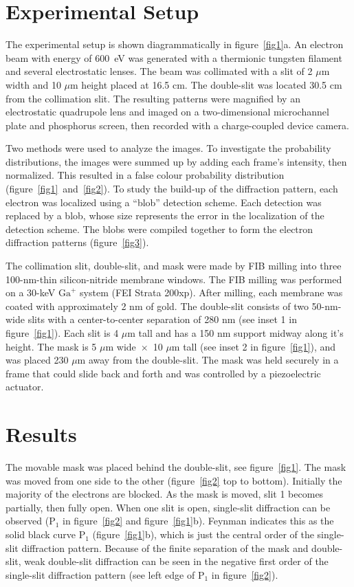 \documentclass[12pt]{iopart}					%
\begin{document}
\section{Experimental Setup}
The experimental setup is shown diagrammatically in figure~\ref{fig1}a.
An electron beam with energy of 600~eV was generated with a thermionic tungsten filament and several electrostatic lenses.
The beam was collimated with a slit of 2 $\mu$m width and 10 $\mu$m height placed at 16.5 cm.
The double-slit was located 30.5 cm from the collimation slit.
The resulting patterns were magnified by an electrostatic quadrupole lens and imaged on a two-dimensional microchannel plate and
phosphorus screen, then recorded with a charge-coupled device camera.

Two methods were used to analyze the images.
To investigate the probability distributions, the images were summed up by adding each frame's intensity, then normalized.
This resulted in a false colour probability distribution (figure~\ref{fig1}~and~\ref{fig2}).
To study the build-up of the diffraction pattern, each electron was localized using a ``blob'' detection scheme\cite{Lindeberg94,Lindeberg98}. Each detection was replaced by a blob,
whose size represents the error in the localization of the detection scheme. The blobs were compiled together to form the electron diffraction patterns (figure~\ref{fig3}).

The collimation slit, double-slit, and mask were made by FIB milling into three 100-nm-thin silicon-nitride membrane windows.
The FIB milling was performed on a 30-keV $\textrm{Ga}^{+}$ system (FEI Strata 200xp).
After milling, each membrane was coated with approximately 2 nm of gold.
The double-slit consists of two 50-nm-wide slits with a center-to-center separation of 280 nm (see inset 1 in figure~\ref{fig1}).
Each slit is 4 $\mu$m tall and has a 150 nm support midway along it's height.
The mask is 5 $\mu$m wide $\! \times \!$ 10 $\mu$m tall (see inset 2 in figure~\ref{fig1}),
and was placed 230 $\mu$m away from the double-slit.
The mask was held securely in a frame that could slide back and forth and was controlled by a piezoelectric actuator.

\section{Results}
The movable mask was placed behind the double-slit, see figure~\ref{fig1}.
The mask was moved from one side to the other (figure~\ref{fig2} top to bottom). 
Initially the majority of the electrons are blocked. As the mask is moved, slit 1 becomes partially, then fully open.
When one slit is open, single-slit diffraction can be observed ($\textrm{P}_{1}$ in figure~\ref{fig2} and figure~\ref{fig1}b).
Feynman indicates this as the solid black curve $\textrm{P}_{1}$ (figure~\ref{fig1}b), which is just the central order of the single-slit diffraction pattern.
Because of the finite separation of the mask and double-slit, 
weak double-slit diffraction can be seen in the negative first order of the single-slit diffraction pattern
(see left edge of $\textrm{P}_{1}$ in figure~\ref{fig2}).
\end{document}
